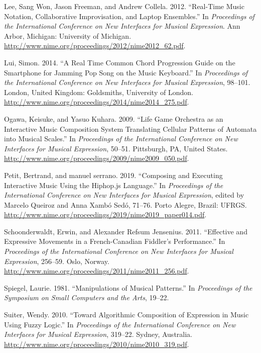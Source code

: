 \documentclass[
]{article}
\newlength{\cslhangindent}
\newenvironment{cslreferences}%
  {\setlength{\parindent}{0pt}%
  \everypar{\setlength{\hangindent}{\cslhangindent}}\ignorespaces}%
  {\par}
\begin{document}
\begin{cslreferences}
\leavevmode\hypertarget{ref-Lee:2012a}{}%
Lee, Sang Won, Jason Freeman, and Andrew Collela. 2012. ``Real-Time
Music Notation, Collaborative Improvisation, and Laptop Ensembles.'' In
\emph{Proceedings of the International Conference on New Interfaces for
Musical Expression}. Ann Arbor, Michigan: University of Michigan.
\url{http://www.nime.org/proceedings/2012/nime2012_62.pdf}.

\leavevmode\hypertarget{ref-slui2014}{}%
Lui, Simon. 2014. ``A Real Time Common Chord Progression Guide on the
Smartphone for Jamming Pop Song on the Music Keyboard.'' In
\emph{Proceedings of the International Conference on New Interfaces for
Musical Expression}, 98--101. London, United Kingdom: Goldsmiths,
University of London.
\url{http://www.nime.org/proceedings/2014/nime2014_275.pdf}.

\leavevmode\hypertarget{ref-Ogawa2009}{}%
Ogawa, Keisuke, and Yasuo Kuhara. 2009. ``Life Game Orchestra as an
Interactive Music Composition System Translating Cellular Patterns of
Automata into Musical Scales.'' In \emph{Proceedings of the
International Conference on New Interfaces for Musical Expression},
50--51. Pittsburgh, PA, United States.
\url{http://www.nime.org/proceedings/2009/nime2009_050.pdf}.

\leavevmode\hypertarget{ref-Petit2019}{}%
Petit, Bertrand, and manuel serrano. 2019. ``Composing and Executing
Interactive Music Using the Hiphop.js Language.'' In \emph{Proceedings
of the International Conference on New Interfaces for Musical
Expression}, edited by Marcelo Queiroz and Anna Xambó Sedó, 71--76.
Porto Alegre, Brazil: UFRGS.
\url{http://www.nime.org/proceedings/2019/nime2019_paper014.pdf}.

\leavevmode\hypertarget{ref-Schoonderwaldt2011}{}%
Schoonderwaldt, Erwin, and Alexander Refsum Jensenius. 2011. ``Effective
and Expressive Movements in a French-Canadian Fiddler's Performance.''
In \emph{Proceedings of the International Conference on New Interfaces
for Musical Expression}, 256--59. Oslo, Norway.
\url{http://www.nime.org/proceedings/2011/nime2011_256.pdf}.

\leavevmode\hypertarget{ref-Spiegel81}{}%
Spiegel, Laurie. 1981. ``Manipulations of Musical Patterns.'' In
\emph{Proceedings of the Symposium on Small Computers and the Arts},
19--22.

\leavevmode\hypertarget{ref-Suiter2010}{}%
Suiter, Wendy. 2010. ``Toward Algorithmic Composition of Expression in
Music Using Fuzzy Logic.'' In \emph{Proceedings of the International
Conference on New Interfaces for Musical Expression}, 319--22. Sydney,
Australia. \url{http://www.nime.org/proceedings/2010/nime2010_319.pdf}.


\end{cslreferences}
\end{document}
